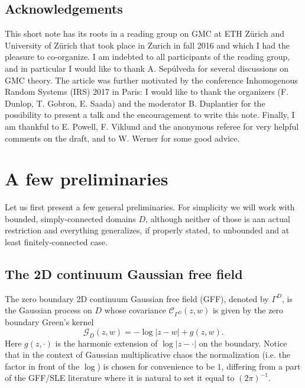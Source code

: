 \documentclass[11pt]{amsart}
\newcommand{\C}{\mathcal C}
\newcommand{\G}{\mathcal G}
\renewcommand{\1}{\mathbf 1}
\begin{document}
\subsection*{Acknowledgements}
This short note has its roots in a reading group on GMC at ETH Z\"urich and University of Z\"urich that took place in Zurich in fall 2016 and which I had the pleasure to co-organize. I am indebted to all participants of the reading group, and in particular I would like to thank A. Sep\'{u}lveda for several discussions on GMC theory. The article was further motivated by the conference Inhomogenous Random Systems (IRS) 2017 in Paris: I would like to thank the organizers (F. Dunlop, T. Gobron, E. Saada) and the moderator B. Duplantier for the possibility to present a talk and the encouragement to write this note. Finally, I am thankful to E. Powell, F. Viklund and the anonymous referee for very helpful comments on the draft, and to W. Werner for some good advice. 



%

\section*{A few preliminaries}

Let us first present a few general preliminaries. For simplicity we will work with bounded, simply-connected domains $D$, although neither of those is aan actual restriction and everything generalizes, if properly stated, to unbounded and at least finitely-connected case. 

\subsection{The 2D continuum Gaussian free field}\label{sec:prelim}

The zero boundary 2D continuum Gaussian free field (GFF), denoted by $\Gamma^D$, is the Gaussian process on $D$ whose covariance $\C_{\Gamma^D}(z,w)$ is given by the zero boundary Green's kernel $$\G_D(z,w) = -\log |z-w| + g(z,w).$$
Here $g(z,\cdot)$ is the harmonic extension of $\log |z-\cdot|$ on the boundary. Notice that in the context of Gaussian multiplicative chaos the normalization (i.e. the factor in front of the $\log$) is chosen for convenience to be $1$, differing from a part of the GFF/SLE literature where it is natural to set it equal to $(2\pi)^{-1}$. 
\end{document}
